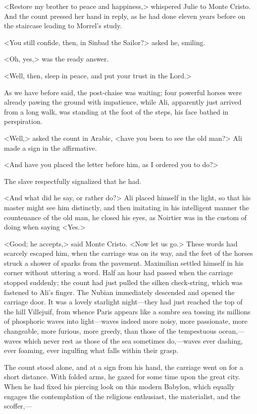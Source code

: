  <Restore my brother to peace and happiness,> whispered Julie to Monte Cristo. And the count pressed her hand in reply, as he had done eleven years before on the staircase leading to Morrel's study. 

 <You still confide, then, in Sinbad the Sailor?> asked he, smiling. 

 <Oh, yes,> was the ready answer. 

 <Well, then, sleep in peace, and put your trust in the Lord.> 

 As we have before said, the post-chaise was waiting; four powerful horses were already pawing the ground with impatience, while Ali, apparently just arrived from a long walk, was standing at the foot of the steps, his face bathed in perspiration. 

 <Well,> asked the count in Arabic, <have you been to see the old man?> Ali made a sign in the affirmative. 

 <And have you placed the letter before him, as I ordered you to do?> 

 The slave respectfully signalized that he had. 

 <And what did he say, or rather do?> Ali placed himself in the light, so that his master might see him distinctly, and then imitating in his intelligent manner the countenance of the old man, he closed his eyes, as Noirtier was in the custom of doing when saying <Yes.> 

 <Good; he accepts,> said Monte Cristo. <Now let us go.>  These words had scarcely escaped him, when the carriage was on its way, and the feet of the horses struck a shower of sparks from the pavement. Maximilian settled himself in his corner without uttering a word. Half an hour had passed when the carriage stopped suddenly; the count had just pulled the silken check-string, which was fastened to Ali's finger. The Nubian immediately descended and opened the carriage door. It was a lovely starlight night—they had just reached the top of the hill Villejuif, from whence Paris appears like a sombre sea tossing its millions of phosphoric waves into light—waves indeed more noisy, more passionate, more changeable, more furious, more greedy, than those of the tempestuous ocean,—waves which never rest as those of the sea sometimes do,—waves ever dashing, ever foaming, ever ingulfing what falls within their grasp. 

 The count stood alone, and at a sign from his hand, the carriage went on for a short distance. With folded arms, he gazed for some time upon the great city. When he had fixed his piercing look on this modern Babylon, which equally engages the contemplation of the religious enthusiast, the materialist, and the scoffer,— 

